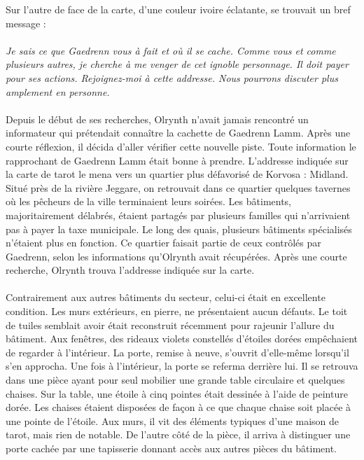 \documentclass[main.tex]{subfiles}
\begin{document}
    Sur l'autre de face de la carte, d'une couleur ivoire éclatante, se trouvait un bref message :\\
    \\
    \textit{
        Je sais ce que Gaedrenn vous à fait et où il se cache.
        Comme vous et comme plusieurs autres, je cherche à me venger de cet ignoble personnage.
        Il doit payer pour ses actions.
        Rejoignez-moi à cette addresse.
        Nous pourrons discuter plus amplement en personne.
    }\\
    \\
    Depuis le début de ses recherches, Olrynth n'avait jamais rencontré un informateur qui prétendait connaître la cachette de Gaedrenn Lamm.
    Après une courte réflexion, il décida d'aller vérifier cette nouvelle piste.
    Toute information le rapprochant de Gaedrenn Lamm était bonne à prendre.
    L'addresse indiquée sur la carte de tarot le mena vers un quartier plus défavorisé de Korvosa : Midland.
    Situé près de la rivière Jeggare, on retrouvait dans ce quartier quelques tavernes où les pêcheurs de la ville terminaient leurs soirées.
    Les bâtiments, majoritairement délabrés, étaient partagés par plusieurs familles qui n'arrivaient pas à payer la taxe municipale.
    Le long des quais, plusieurs bâtiments spécialisés n'étaient plus en fonction.
    Ce quartier faisait partie de ceux contrôlés par Gaedrenn, selon les informations qu'Olrynth avait récupérées.
    Après une courte recherche, Olrynth trouva l'addresse indiquée sur la carte.\\
    \\
    Contrairement aux autres bâtiments du secteur, celui-ci était en excellente condition.
    Les murs extérieurs, en pierre, ne présentaient aucun défauts.
    Le toit de tuiles semblait avoir était reconstruit récemment pour rajeunir l'allure du bâtiment.
    Aux fenêtres, des rideaux violets constellés d'étoiles dorées empêchaient de regarder à l'intérieur.
    La porte, remise à neuve, s'ouvrit d'elle-même lorsqu'il s'en approcha.
    Une fois à l'intérieur, la porte se referma derrière lui.
    Il se retrouva dans une pièce ayant pour seul mobilier une grande table circulaire et quelques chaises.
    Sur la table, une étoile à cinq pointes était dessinée à l'aide de peinture dorée.
    Les chaises étaient disposées de façon à ce que chaque chaise soit placée à une pointe de l'étoile.
    Aux murs, il vit des éléments typiques d'une maison de tarot, mais rien de notable.
    De l'autre côté de la pièce, il arriva à distinguer une porte cachée par une tapisserie donnant accès aux autres pièces du bâtiment.\\
\end{document}
